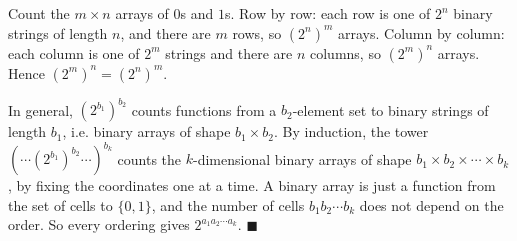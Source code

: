 Count the $m\times n$ arrays of $0$s and $1$s. Row by row: each row is one of $2^n$ binary strings of length $n$, and there are $m$ rows, so $(2^n)^m$ arrays. Column by column: each column is one of $2^m$ strings and there are $n$ columns, so $(2^m)^n$ arrays. Hence $(2^m)^n=(2^n)^m$.

In general, $\left(2^{b_1}\right)^{b_2}$ counts functions from a $b_2$-element set to binary strings of length $b_1$, i.e. binary arrays of shape $b_1\times b_2$. By induction, the tower $\left(\cdots\left(2^{b_1}\right)^{b_2}\cdots\right)^{b_k}$ counts the $k$-dimensional binary arrays of shape $b_1\times b_2\times\cdots\times b_k$, by fixing the coordinates one at a time. A binary array is just a function from the set of cells to $\{0,1\}$, and the number of cells $b_1b_2\cdots b_k$ does not depend on the order. So every ordering gives $2^{a_1a_2\cdots a_k}$. $\blacksquare$

